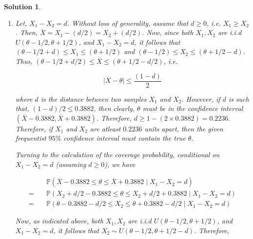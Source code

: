 \documentclass[12pt]{article}
\theoremstyle{problemstyle}
\newtheorem*{solution*}{Solution}
\newcommand{\prob}{\mathbb{P}}
\begin{document}
\begin{solution*}
    \begin{enumerate}
        \item[(a)] Let, $X_1 - X_2 = d$. Without loss of generality, assume that $d \geq 0$, i.e. $X_1 \geq X_2$. Then, $\overline{X} = X_1 - (d/2) = X_2 + (d/2)$. Now, since both $X_1, X_2$ are i.i.d $U\left( \theta - 1/2, \theta + 1/2 \right)$, and $X_1 - X_2 = d$, it follows that $(\theta - 1/2 + d) \leq X_1 \leq (\theta + 1/2)$ and $(\theta - 1/2) \leq X_2 \leq (\theta + 1/2 - d)$. Thus, $(\theta - 1/2 + d/2) \leq \overline{X} \leq (\theta + 1/2 - d/2)$, i.e.
         
        $$
        \vert \overline{X} - \theta \vert \leq \dfrac{(1-d)}{2}
        $$

        where $d$ is the distance between two samples $X_1$ and $X_2$. However, if $d$ is such that, $(1-d)/2 \leq 0.3882$, then clearly, $\theta$ must be in the confidence interval $(\overline{X} - 0.3882,\overline{X} + 0.3882)$. Therefore, $d \geq 1 - (2 \times 0.3882) = 0.2236$. Therefore, if $X_1$ and $X_2$ are atleast $0.2236$ units apart, then the given frequentist $95\%$ confidence interval must contain the true $\theta$.

        Turning to the calculation of the coverage probability, conditional on $X_1 - X_2 = d$ (assuming $d \geq 0$), we have 

        \begin{align*}
            & \prob\left( \overline{X} - 0.3882 \leq \theta \leq \overline{X} + 0.3882 \mid X_1 - X_2 = d \right)\\
            = \quad & \prob\left( X_2 + d/2 - 0.3882 \leq \theta \leq X_2 + d/2 + 0.3882 \mid X_1 - X_2 = d \right)\\
            = \quad & \prob\left( \theta - 0.3882 - d/2 \leq X_2 \leq \theta + 0.3882 - d/2 \mid X_1 - X_2 = d \right)
        \end{align*}

        Now, as indicated above, both $X_1, X_2$ are i.i.d $U\left( \theta - 1/2, \theta + 1/2 \right)$, and $X_1 - X_2 = d$, it follows that $X_2 \sim U\left(\theta - 1/2, \theta + 1/2 - d\right)$. Therefore,


\end{enumerate}
\end{solution*}
\end{document}
